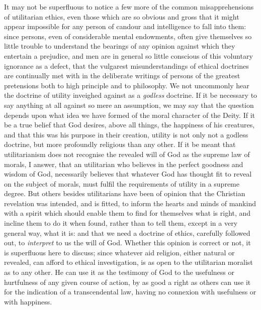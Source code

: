 \documentclass[12pt]{report}
\begin{document}
It may not be superfluous to notice a few more of the common misapprehensions of utilitarian ethics, even those which are so obvious and gross that it might appear impossible for any person of candour and intelligence to fall into them: since persons, even of considerable mental endowments, often give themselves so little trouble to understand the bearings of any opinion against which they entertain a prejudice, and men are in general so little conscious of this voluntary ignorance as a defect, that the vulgarest misunderstandings of ethical doctrines are continually met with in the deliberate writings of persons of the greatest pretensions both to high principle and to philosophy. We not uncommonly hear the doctrine of utility inveighed against as a \emph{godless} doctrine. If it be necessary to say anything at all against so mere an assumption, we may say that the question depends upon what idea we have formed of the moral character of the Deity. If it be a true belief that God desires, above all things, the happiness of his creatures, and that this was his purpose in their creation, utility is not only not a godless doctrine, but more profoundly religious than any other. If it be meant that utilitarianism does not recognise the revealed will of God as the supreme law of morals, I answer, that an utilitarian who believes in the perfect goodness and wisdom of God, necessarily believes that whatever God has thought fit to reveal on the subject of morals, must fulfil the requirements of utility in a supreme degree. But others besides utilitarians have been of opinion that the Christian revelation was intended, and is fitted, to inform the hearts and minds of mankind with a spirit which should enable them to find for themselves what is right, and incline them to do it when found, rather than to tell them, except in a very general way, what it is: and that we need a doctrine of ethics, carefully followed out, to \emph{interpret} to us the will of God. Whether this opinion is correct or not, it is superfluous here to discuss; since whatever aid religion, either natural or revealed, can afford to ethical investigation, is as open to the utilitarian moralist as to any other. He can use it as the testimony of God to the usefulness or hurtfulness of any given course of action, by as good a right as others can use it for the indication of a transcendental law, having no connexion with usefulness or with happiness.
\end{document}
